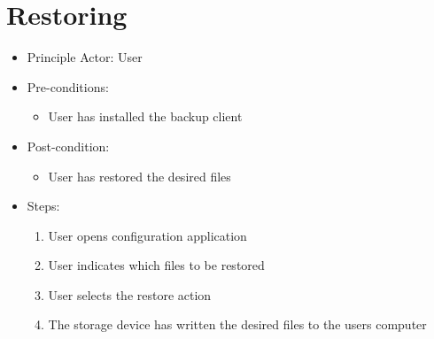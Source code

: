 \section{Restoring}
\begin{itemize}
	\item Principle Actor: User
	\item Pre-conditions: 
		\begin{itemize}
			\item User has installed the backup client
		\end{itemize}
	\item Post-condition:
			\begin{itemize}
				\item User has restored the desired files
			\end{itemize}
	\item Steps:
		\begin{enumerate}
			\item User opens configuration application
			\item User indicates which files to be restored
			\item User selects the restore action
			\item The storage device has written the desired files to the users computer
		\end{enumerate}
\end{itemize}
